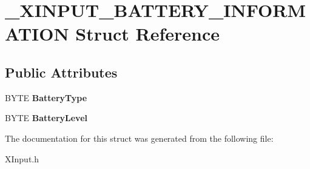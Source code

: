 \hypertarget{struct___x_i_n_p_u_t___b_a_t_t_e_r_y___i_n_f_o_r_m_a_t_i_o_n}{}\section{\+\_\+\+X\+I\+N\+P\+U\+T\+\_\+\+B\+A\+T\+T\+E\+R\+Y\+\_\+\+I\+N\+F\+O\+R\+M\+A\+T\+I\+O\+N Struct Reference}
\label{struct___x_i_n_p_u_t___b_a_t_t_e_r_y___i_n_f_o_r_m_a_t_i_o_n}
\subsection*{Public Attributes}
\begin{DoxyCompactItemize}
\item 
\hypertarget{struct___x_i_n_p_u_t___b_a_t_t_e_r_y___i_n_f_o_r_m_a_t_i_o_n_a4b2dca8424bb237f4f4c68a93d4225ca}{}B\+Y\+T\+E {\bfseries Battery\+Type}\label{struct___x_i_n_p_u_t___b_a_t_t_e_r_y___i_n_f_o_r_m_a_t_i_o_n_a4b2dca8424bb237f4f4c68a93d4225ca}

\item 
\hypertarget{struct___x_i_n_p_u_t___b_a_t_t_e_r_y___i_n_f_o_r_m_a_t_i_o_n_a2fed4d1573d0b38752d32b0d3666259d}{}B\+Y\+T\+E {\bfseries Battery\+Level}\label{struct___x_i_n_p_u_t___b_a_t_t_e_r_y___i_n_f_o_r_m_a_t_i_o_n_a2fed4d1573d0b38752d32b0d3666259d}

\end{DoxyCompactItemize}


The documentation for this struct was generated from the following file\+:\begin{DoxyCompactItemize}
\item 
X\+Input.\+h\end{DoxyCompactItemize}
